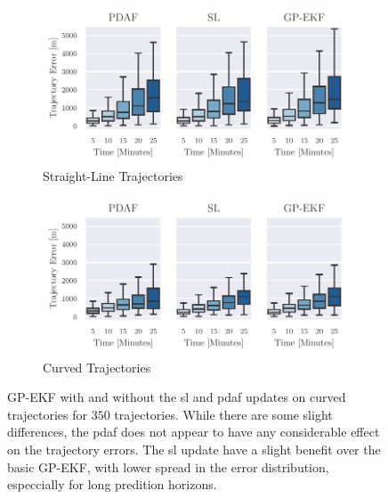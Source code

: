 \begin{figure}[h]
    \centering
    \begin{subfigure}{1\textwidth}
        \includegraphics[width=\textwidth]{figures/straight_line_stats/gp_vs_update.pdf}
        \caption{Straight-Line Trajectories}
    \end{subfigure}
    \begin{subfigure}{1\textwidth}
        \includegraphics[width=\textwidth]{figures/curved_line_stats/gp_vs_update.pdf}
        \caption{Curved Trajectories}
    \end{subfigure}
    \caption{GP-EKF with and without the \acrshort{sl} and \acrshort{pdaf} updates on curved trajectories for $350$ trajectories. While there are some slight differences, the \acrshort{pdaf} does not appear to have any considerable effect on the trajectory errors. The \acrshort{sl} update have a slight benefit over the basic GP-EKF, with lower spread in the error distribution, especcially for long predition horizons.}
    \label{fig:stats_gp_ekf_with_or_without_update}
\end{figure}

